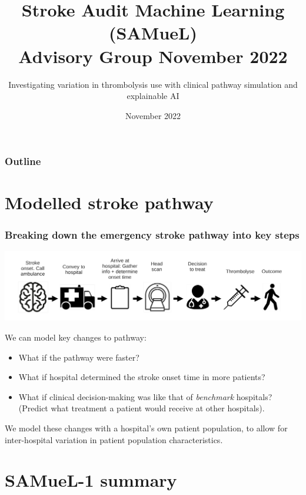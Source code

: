 \documentclass{beamer}
\title{Stroke Audit Machine Learning (SAMueL) \\ Advisory Group November 2022}
\subtitle{Investigating variation in thrombolysis use with clinical pathway simulation and explainable AI}
\date{November 2022}
\begin{document}

\begin{frame}
\titlepage

\end{frame}



\begin{frame}
\frametitle{Outline}
\tableofcontents
\end{frame}

\section{Modelled stroke pathway}


\begin{frame}
\frametitle{Breaking down the emergency stroke pathway into key steps}
\begin{center}
\includegraphics[width=1.0\textwidth]{./images/pathway}
\end{center}
We can model key changes to pathway:
\begin{small}
\begin{itemize}
    \item What if the pathway were faster?
    \item What if hospital determined the stroke onset time in more patients?
    \item What if clinical decision-making was like that of \emph{benchmark} hospitals? (Predict what treatment a patient would receive at other hospitals).
\end{itemize}
\end{small}
\footnotesize{We model these changes with a hospital's own patient population, to allow for inter-hospital variation in patient population characteristics.}
\end{frame}

\section{SAMueL-1 summary}
\end{document}
